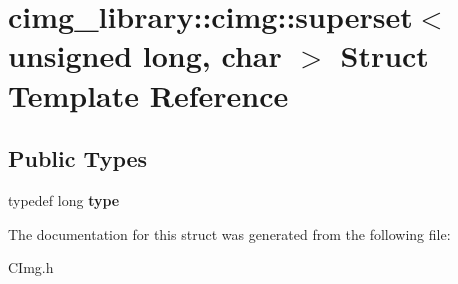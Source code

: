 \hypertarget{structcimg__library_1_1cimg_1_1superset_3_01unsigned_01long_00_01char_01_4}{\section{cimg\-\_\-library\-:\-:cimg\-:\-:superset$<$ unsigned long, char $>$ Struct Template Reference}
\label{structcimg__library_1_1cimg_1_1superset_3_01unsigned_01long_00_01char_01_4}
}
\subsection*{Public Types}
\begin{DoxyCompactItemize}
\item 
\hypertarget{structcimg__library_1_1cimg_1_1superset_3_01unsigned_01long_00_01char_01_4_ad2ac553ed9506860c2b4b63ef5743ec8}{typedef long {\bfseries type}}\label{structcimg__library_1_1cimg_1_1superset_3_01unsigned_01long_00_01char_01_4_ad2ac553ed9506860c2b4b63ef5743ec8}

\end{DoxyCompactItemize}


The documentation for this struct was generated from the following file\-:\begin{DoxyCompactItemize}
\item 
C\-Img.\-h\end{DoxyCompactItemize}
